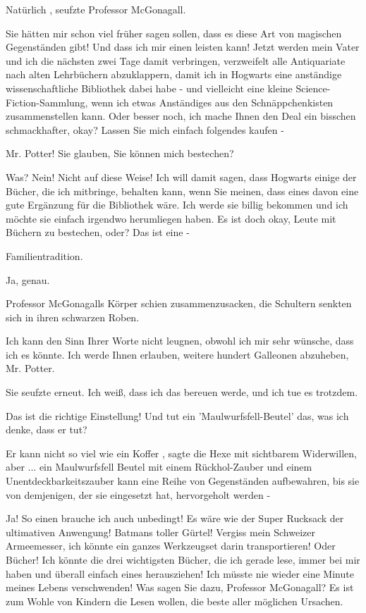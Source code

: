 \glqq Natürlich\grqq{} , seufzte
Professor McGonagall.

\glqq Sie hätten mir schon viel früher sagen sollen, dass es diese Art von magischen
Gegenständen gibt! Und dass ich mir einen leisten kann! Jetzt werden mein Vater und ich die nächsten zwei Tage damit
verbringen, verzweifelt alle Antiquariate nach alten Lehrbüchern abzuklappern, damit ich in Hogwarts eine anständige
wissenschaftliche Bibliothek dabei habe - und vielleicht eine kleine Science-Fiction-Sammlung, wenn ich etwas
Anständiges aus den Schnäppchenkisten zusammenstellen kann. Oder besser noch, ich mache Ihnen den Deal ein bisschen
schmackhafter, okay? Lassen Sie mich einfach folgendes kaufen -\grqq{}

\glqq Mr. Potter! Sie glauben, Sie
können mich bestechen?\grqq{}

\glqq Was? Nein! Nicht auf diese Weise! Ich will damit sagen, dass Hogwarts
einige der Bücher, die ich mitbringe, behalten kann, wenn Sie meinen, dass eines davon eine gute Ergänzung für die
Bibliothek wäre. Ich werde sie billig bekommen und ich möchte sie einfach irgendwo herumliegen haben. Es ist doch okay,
Leute mit Büchern zu bestechen, oder? Das ist eine -\grqq{}

\glqq Familientradition.\grqq{}

\glqq Ja, genau.\grqq{}

Professor McGonagalls Körper schien zusammenzusacken, die Schultern
senkten sich in ihren schwarzen Roben.

\glqq Ich kann den Sinn Ihrer Worte nicht leugnen, obwohl ich mir
sehr wünsche, dass ich es könnte. Ich werde Ihnen erlauben, weitere hundert Galleonen abzuheben, Mr. Potter.\grqq{}

Sie seufzte erneut. \glqq Ich weiß, dass ich das bereuen werde, und ich tue es trotzdem.\grqq{}

\glqq Das ist die richtige Einstellung! Und tut ein 'Maulwurfsfell-Beutel' das, was ich denke, dass er tut?\grqq{}

\glqq Er kann nicht so viel wie ein Koffer\grqq{} , sagte die Hexe mit sichtbarem Widerwillen, \glqq aber ...
ein Maulwurfsfell Beutel mit einem Rückhol-Zauber und einem Unentdeckbarkeitszauber kann eine Reihe von Gegenständen
aufbewahren, bis sie von demjenigen, der sie eingesetzt hat, hervorgeholt werden -\grqq{}

\glqq Ja! So einen
brauche ich auch unbedingt! Es wäre wie der Super Rucksack der ultimativen Anwengung! Batmans toller Gürtel! Vergiss
mein Schweizer Armeemesser, ich könnte ein ganzes Werkzeugset darin transportieren! Oder Bücher! Ich könnte die drei
wichtigsten Bücher, die ich gerade lese, immer bei mir haben und überall einfach eines herausziehen! Ich müsste nie
wieder eine Minute meines Lebens verschwenden! Was sagen Sie dazu, Professor McGonagall? Es ist zum Wohle von Kindern
die Lesen wollen, die beste aller möglichen Ursachen.\grqq{}

